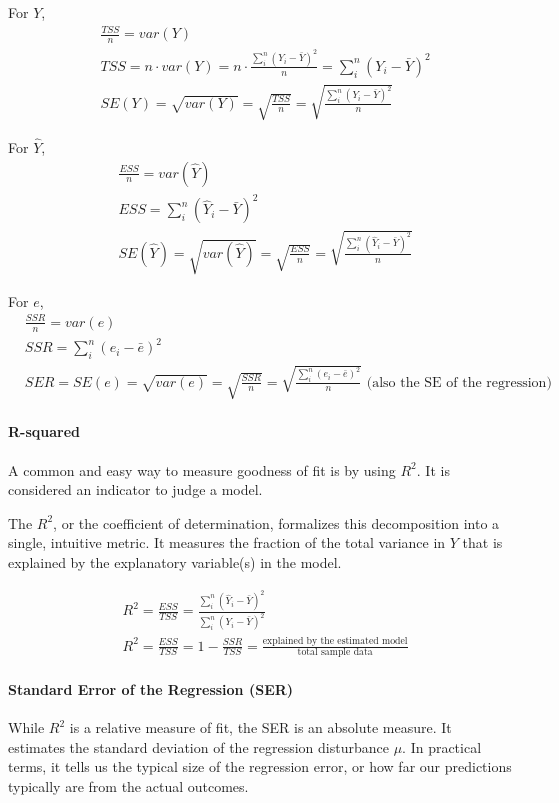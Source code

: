 \documentclass{article}
\begin{document}
For $Y$,
\begin{align}
&\frac{TSS}{n}=var(Y)
\\& TSS=n \cdot var(Y)=n \cdot \frac{\sum\limits_i^n (Y_i-\bar Y)^2}{n}=\sum\limits_i^n (Y_i-\bar Y)^2
\\& SE(Y)=\sqrt{var(Y)}=\sqrt{\frac{TSS}{n}}=\sqrt{\frac{\sum\limits_i^n (Y_i-\bar Y)^2}{n}}
\end{align}

For $\hat Y$,
\begin{align}
&\frac{ESS}{n}=var(\hat Y)
\\&ESS=\sum\limits_i^n (\hat Y_i-\bar Y)^2
\\&SE(\hat Y)=\sqrt{var(\hat Y)}=\sqrt{\frac{ESS}{n}}=\sqrt{\frac{\sum\limits_i^n (\hat Y_i-\bar Y)^2}{n}}
\end{align}

For $e$,
\begin{align}
&\frac{SSR}{n}=var(e)
\\&SSR=\sum\limits_i^n (e_i-\bar e)^2
\\&SER=SE(e)=\sqrt{var(e)}=\sqrt{\frac{SSR}{n}}=\sqrt{\frac{\sum\limits_i^n (e_i-\bar e)^2}{n}} \text{ (also the SE of the regression)}
\end{align}

\paragraph{R-squared}

A common and easy way to measure goodness of fit is by using $R^2$. It is considered an indicator to judge a model.

The $R^2$, or the coefficient of determination, formalizes this decomposition into a single, intuitive metric. It measures the fraction of the total variance in $Y$ that is explained by the explanatory variable(s) in the model.

\begin{align}
& R^2=\frac{ESS}{TSS}=\frac{\sum\limits_i^n (\hat Y_i-\bar Y)^2}{\sum\limits_i^n (Y_i-\bar Y)^2}
\\&R^2=\frac{ESS}{TSS}=1-\frac{SSR}{TSS}=\frac{\text{explained by the estimated model}}{\text{total sample data}}
\end{align}



\paragraph{Standard Error of the Regression (SER)}
While $R^2$ is a relative measure of fit, the SER is an absolute measure. It estimates the standard deviation of the regression disturbance $\mu$. In practical terms, it tells us the typical size of the regression error, or how far our predictions typically are from the actual outcomes.
\end{document}
